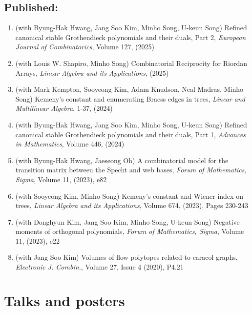 \documentclass[letterpaper]{article}
\begin{document}
\subsection*{Published:}
\begin{enumerate}
\item (with Byung-Hak Hwang, Jang Soo Kim, Minho Song, U-keun Song) Refined canonical stable Grothendieck polynomials and their duals, Part 2, {\it European Journal of Combinatorics}, Volume 127, (2025)
\item (with Louis W. Shapiro, Minho Song) Combinatorial Reciprocity for Riordan Arrays, {\it Linear Algebra and its Applications}, (2025)
\item (with Mark Kempton, Sooyeong Kim, Adam Knudson, Neal Madras, Minho Song) Kemeny’s constant and enumerating Braess edges in trees, {\it Linear and Multilinear Algebra}, 1-37, (2024)
\item (with Byung-Hak Hwang, Jang Soo Kim, Minho Song, U-keun Song) Refined canonical stable Grothendieck polynomials and their duals, Part 1,
  {\it Advances in Mathematics}, Volume 446, (2024)
\item (with Byung-Hak Hwang, Jaeseong Oh) A combinatorial model for the transition matrix between the Specht and web bases,
  {\it Forum of Mathematics, Sigma}, Volume 11, (2023), e82
\item (with Sooyeong Kim, Minho Song) Kemeny’s constant and Wiener index on trees,
  {\it Linear Algebra and its Applications}, Volume 674, (2023), Pages 230-243
\item (with Donghyun Kim, Jang Soo Kim, Minho Song, U-keun Song) Negative moments of orthogonal polynomials,
  {\it Forum of Mathematics, Sigma}, Volume 11, (2023), e22
\item (with Jang Soo Kim) Volumes of flow polytopes related to caracol graphs,
  {\it Electronic J. Combin.}, Volume 27, Issue 4 (2020), P4.21
\end{enumerate}


\section*{Talks and posters}
\end{document}
